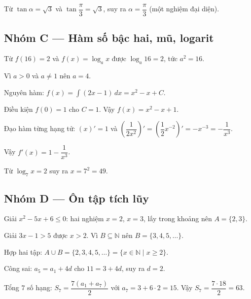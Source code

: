 \documentclass[11pt, a4paper]{article}
\begin{document}
\begin{dapan}[19 — Đáp án B]
Từ $\tan\alpha = \sqrt{3}$ và $\tan\dfrac{\pi}{3} = \sqrt{3}$, suy ra $\alpha = \dfrac{\pi}{3}$ (một nghiệm đại diện).
\end{dapan}

\subsection*{Nhóm C — Hàm số bậc hai, mũ, logarit}

\begin{dapan}[20 — Đáp án C]
Từ $f(16) = 2$ và $f(x) = \log_a x$ được $\log_a 16 = 2$, tức $a^2 = 16$.

Vì $a > 0$ và $a \neq 1$ nên $a = 4$.
\end{dapan}

\begin{dapan}[21 — Đáp án A]
Nguyên hàm: $f(x) = \int (2x - 1)\,dx = x^2 - x + C$.

Điều kiện $f(0) = 1$ cho $C = 1$. Vậy $f(x) = x^2 - x + 1$.
\end{dapan}

\begin{dapan}[22 — Đáp án B]
Đạo hàm từng hạng tử: $\left(x\right)' = 1$ và $\left(\dfrac{1}{2x^2}\right)' = \left(\dfrac{1}{2}x^{-2}\right)' = -x^{-3} = -\dfrac{1}{x^3}$.

Vậy $f'(x) = 1 - \dfrac{1}{x^3}$.
\end{dapan}

\begin{dapan}[23 — Đáp án B]
Từ $\log_7 x = 2$ suy ra $x = 7^2 = 49$.
\end{dapan}

\subsection*{Nhóm D — Ôn tập tích lũy}

\begin{dapan}[24 — Đáp án D]
Giải $x^2 - 5x + 6 \le 0$: hai nghiệm $x = 2$, $x = 3$, lấy trong khoảng nên $A = \{2, 3\}$.

Giải $3x - 1 > 5$ được $x > 2$. Vì $B \subseteq \mathbb{N}$ nên $B = \{3, 4, 5, \ldots\}$.

Hợp hai tập: $A \cup B = \{2, 3, 4, 5, \ldots\} = \{x \in \mathbb{N} \mid x \ge 2\}$.
\end{dapan}

\begin{dapan}[25 — Đáp án A]
Công sai: $a_5 = a_1 + 4d$ cho $11 = 3 + 4d$, suy ra $d = 2$.

Tổng $7$ số hạng: $S_7 = \dfrac{7(a_1 + a_7)}{2}$ với $a_7 = 3 + 6 \cdot 2 = 15$. Vậy $S_7 = \dfrac{7 \cdot 18}{2} = 63$.
\end{dapan}
\end{document}
